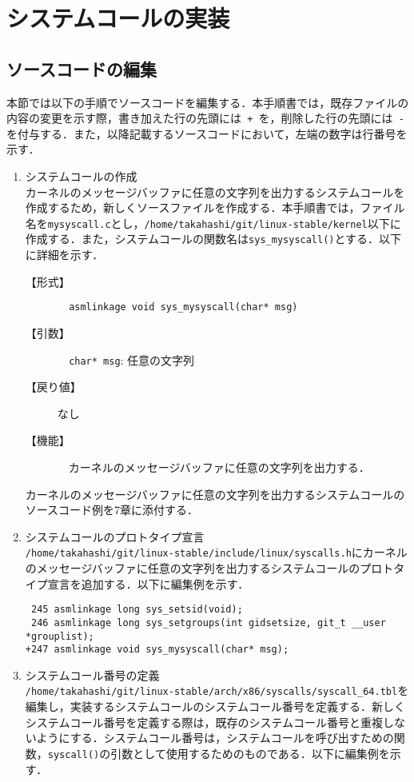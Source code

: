 \documentclass[12pt]{jsarticle}
\begin{document}
\newpage
\section{システムコールの実装}
\label{sec:overview}
\subsection{ソースコードの編集}
本節では以下の手順でソースコードを編集する．本手順書では，既存ファイルの内容の変更を示す際，書き加えた行の先頭には\verb| + |を，削除した行の先頭には\verb| - |を付与する．また，以降記載するソースコードにおいて，左端の数字は行番号を示す．

\begin{enumerate}
\item システムコールの作成\\
  カーネルのメッセージバッファに任意の文字列を出力するシステムコールを作成するため，新しくソースファイルを作成する．本手順書では，ファイル名を\verb|mysyscall.c|とし，\verb|/home/takahashi/git/linux-stable/kernel|以下に作成する．また，システムコールの関数名は\verb|sys_mysyscall()|とする．以下に詳細を示す．
  \begin{description}
  \item[【形式】] \verb|  asmlinkage void sys_mysyscall(char* msg)|
  \item[【引数】] \verb|  char* msg|: 任意の文字列
  \item[【戻り値】] なし
  \item[【機能】] 　カーネルのメッセージバッファに任意の文字列を出力する．
  \end{description}
カーネルのメッセージバッファに任意の文字列を出力するシステムコールのソースコード例を7章に添付する．

\item システムコールのプロトタイプ宣言\\
  \verb|/home/takahashi/git/linux-stable/include/linux/syscalls.h|にカーネルのメッセージバッファに任意の文字列を出力するシステムコールのプロトタイプ宣言を追加する．以下に編集例を示す．

\begin{verbatim}
 245 asmlinkage long sys_setsid(void);
 246 asmlinkage long sys_setgroups(int gidsetsize, git_t __user *grouplist);
+247 asmlinkage void sys_mysyscall(char* msg);
\end{verbatim}

\item システムコール番号の定義\\
  \verb|/home/takahashi/git/linux-stable/arch/x86/syscalls/syscall_64.tbl|を編集し，実装するシステムコールのシステムコール番号を定義する．新しくシステムコール番号を定義する際は，既存のシステムコール番号と重複しないようにする．システムコール番号は，システムコールを呼び出すための関数，\verb|syscall()|の引数として使用するためのものである．以下に編集例を示す．


\end{enumerate}
\end{document}
